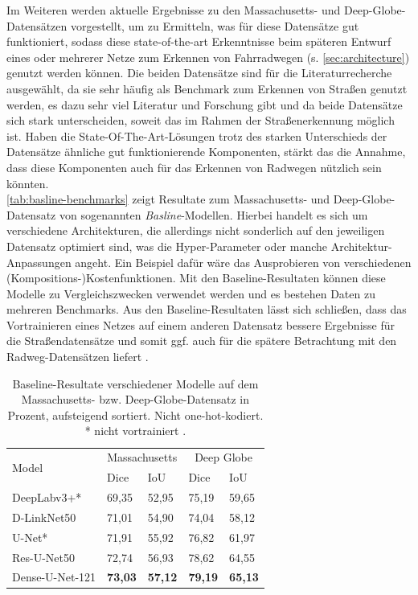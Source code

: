 Im Weiteren werden aktuelle Ergebnisse zu den Massachusetts- und Deep-Globe-Datensätzen vorgestellt, 
um zu Ermitteln, was für diese Datensätze gut funktioniert, sodass diese state-of-the-art Erkenntnisse beim 
späteren Entwurf eines oder mehrerer Netze zum Erkennen von Fahrradwegen (s. \autoref{sec:architecture}) 
genutzt werden können. Die beiden Datensätze sind für die Literaturrecherche ausgewählt, 
da sie sehr häufig als Benchmark zum Erkennen von Straßen genutzt werden, es dazu sehr viel Literatur und 
Forschung gibt und da beide Datensätze sich stark unterscheiden, soweit das im Rahmen der Straßenerkennung möglich ist. 
Haben die State-Of-The-Art-Lösungen trotz des starken Unterschieds der Datensätze ähnliche gut funktionierende
Komponenten, stärkt das die Annahme, dass diese Komponenten auch für das Erkennen von Radwegen nützlich sein könnten. \\   
\autoref{tab:basline-benchmarks} zeigt Resultate zum Massachusetts- und Deep-Globe-Datensatz von sogenannten \textit{Basline}-Modellen.
Hierbei handelt es sich um verschiedene Architekturen, die allerdings nicht sonderlich auf den jeweiligen Datensatz optimiert sind,
was die Hyper-Parameter oder manche Architektur-Anpassungen angeht. Ein Beispiel dafür wäre das Ausprobieren von verschiedenen (Kompositions-)Kostenfunktionen. 
Mit den Baseline-Resultaten können diese Modelle zu Vergleichszwecken verwendet werden 
und es bestehen Daten zu mehreren Benchmarks. Aus den Baseline-Resultaten lässt sich schließen, dass das Vortrainieren eines Netzes auf einem 
anderen Datensatz bessere Ergebnisse für die Straßendatensätze und somit ggf. auch für die spätere Betrachtung mit 
den Radweg-Datensätzen liefert \cite{C.Henry.2021}.

\begin{table}
	\centering
	\begin{tabular}{l|l|l|l|l}
		\multirow{2}{*}{Model} & \multicolumn{2}{c|}{Massachusetts} & \multicolumn{2}{c}{Deep Globe}  \\
		& Dice & IoU & Dice & IoU \\
		\midrule
		DeepLabv3+* & 69,35 & 52,95 & 75,19 & 59,65 \\
		D-LinkNet50 & 71,01 & 54,90 & 74,04 & 58,12 \\
		U-Net* & 71,91 & 55,92 & 76,82 & 61,97 \\
		Res-U-Net50 & 72,74 & 56,93 & 78,62 & 64,55  \\
		Dense-U-Net-121 & \textbf{73,03} & \textbf{57,12} & \textbf{79,19} & \textbf{65,13}  \\
	\end{tabular}
	\caption{Baseline-Resultate verschiedener Modelle auf dem Massachusetts- 
	bzw. Deep-Globe-Datensatz in Prozent, aufsteigend sortiert. Nicht one-hot-kodiert. * nicht vortrainiert \cite{C.Henry.2021}.}
	\label{tab:basline-benchmarks}
\end{table}

